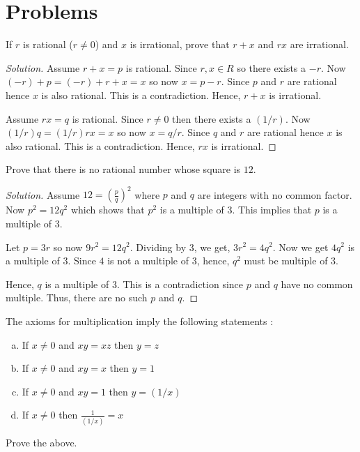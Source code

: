 

\chapter*{Problems}

\bigbreak

\begin{prblm}
	If $r$ is rational ($r \neq 0$) and $x$ is irrational, prove that $r + x$ and $rx$ are irrational.
\end{prblm}

\begin{proof}[Solution]
	Assume $r + x = p$ is rational. Since $r, x \in R$ so there exists a $-r$.
	Now $(-r) + p = (-r) + r + x = x$ so now $x = p - r$. Since $p$ and $r$ are rational hence $x$ is also rational.
	This is a contradiction. Hence, $r + x$ is irrational.

	Assume $rx = q$ is rational. Since $r \neq 0$ then there exists a $(1/r)$.
	Now $(1/r)q = (1/r)rx = x$ so now $x = q/r$. Since $q$ and $r$ are rational hence $x$ is also rational.
	This is a contradiction. Hence, $rx$ is irrational.
\end{proof}

\begin{prblm}
	Prove that there is no rational number whose square is $12$.
\end{prblm}

\begin{proof}[Solution]
	Assume $12 = \left( \frac{p}{q} \right)^2$ where $p$ and $q$ are integers with no common factor.
	Now $p^2 = 12q^2$ which shows that $p^2$ is a multiple of $3$.
	This implies that $p$ is a multiple of $3$.

	Let $p = 3r$ so now $9r^2 = 12q^2$.
	Dividing by $3$, we get, $3r^2 = 4q^2$. Now we get $4q^2$ is a multiple of $3$.
	Since $4$ is not a multiple of $3$, hence, $q^2$ must be multiple of $3$.

	Hence, $q$ is a multiple of $3$. This is a contradiction since $p$ and $q$ have no common multiple.
	Thus, there are no such $p$ and $q$.

\end{proof}

\begin{prblm}
	The axioms for multiplication imply the following statements :
	\begin{enumerate}[a)]
		\item If $x \neq 0$ and $xy = xz$ then $y = z$
		\item If $x \neq 0$ and $xy = x$ then $y = 1$
		\item If $x \neq 0$ and $xy = 1$ then $y = (1/x)$
		\item If $x \neq 0$ then $\frac{1}{(1/x)}= x$
	\end{enumerate}
	Prove the above.
\end{prblm}

